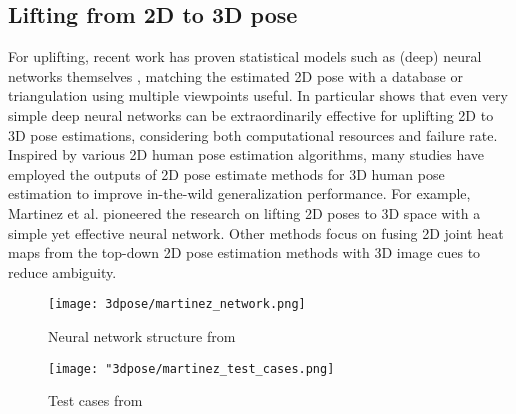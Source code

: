 \subsection{Lifting from 2D to 3D pose}
For uplifting, recent work has proven statistical models such as (deep) neural networks themselves \cite{Tome_2017_CVPR, Martinez_2017_ICCV}, matching the estimated 2D pose with a database \cite{Chen_2017_CVPR} or triangulation using multiple viewpoints \cite{Dong_2019_CVPR} useful. In particular \cite{Martinez_2017_ICCV} shows that even very simple deep neural networks can be extraordinarily effective for uplifting 2D to 3D pose estimations, considering both computational resources and failure rate.
\newline
Inspired by various 2D human pose estimation algorithms, many studies have employed the outputs of 2D pose estimate methods for 3D human pose estimation to improve in-the-wild generalization performance. For example, Martinez et al. \cite{Martinez_2017_ICCV} pioneered the research on lifting 2D poses to 3D space with a simple yet effective neural network. Other methods \cite{park_3d_2016, wang_deep_2021, zhou_hemlets_2019, habibie_wild_2019, tekin_learning_2017} focus on fusing 2D joint heat maps from the top-down 2D pose estimation methods with 3D image cues to reduce ambiguity. 

\begin{figure*}[!htb]
	\centering
	\texttt{[image: 3dpose/martinez\_network.png]}
	\caption{Neural network structure from \cite{Martinez_2017_ICCV}}
	\label{fig:martinez_network}
\end{figure*}

\begin{figure*}[!htb]
	\centering
	\texttt{[image: "3dpose/martinez\_test\_cases.png]}
	\caption{Test cases from \cite{Martinez_2017_ICCV}}
	\label{fig:martinez_test_cases}
\end{figure*}

